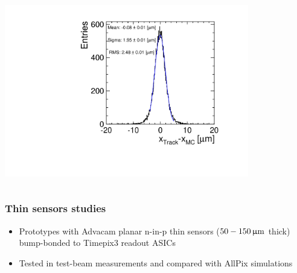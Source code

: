 \begin{frame}
\begin{columns}
    \centering
    \includegraphics[width=0.8\textwidth]{../figures/Telescope/Unbiased_trackRes_DUT_x.pdf}
  \end{columns}

\end{frame}

\begin{frame}
  \frametitle{Thin sensors studies}

  \begin{itemize}
  \item Prototypes with Advacam planar n-in-p thin sensors
    ($50 - 150\,\upmu\mathrm{m}$ thick) bump-bonded to Timepix3 readout ASICs
  \item Tested in test-beam measurements and compared with AllPix
    simulations
  \end{itemize}

\end{frame}

